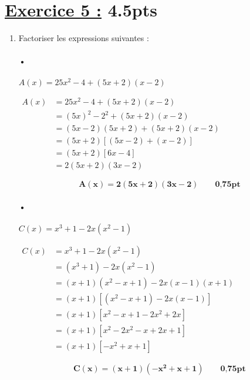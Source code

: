 \documentclass[12pt,a4paper]{article}
\begin{document}
\section*{\underline{Exercice 5 :} 4.5pts}
\begin{enumerate}
    \item Factoriser les expressions suivantes :
 
\paragraph{•}   
\( A(x) = 25x^2 - 4 + (5x + 2)(x - 2) \)

\(
\begin{aligned}
A(x) &= 25x^2 - 4 + (5x + 2)(x - 2) \\
     &= (5x)^2 - 2^2 + (5x + 2)(x - 2) \\
     &= (5x - 2)(5x + 2) + (5x + 2)(x - 2) \\
     &= (5x + 2)\left[(5x - 2) + (x - 2)\right] \\
     &= (5x + 2)\left[6x - 4\right] \\
     &= 2(5x + 2)(3x - 2)
\end{aligned}
\)

\begin{tcolorbox}[colback=yellow!20, colframe=black, sharp corners]
    \[
    \mathbf{A(x) = 2(5x + 2)(3x - 2)}\quad\quad \textbf{0,75pt}
    \]
\end{tcolorbox}

\paragraph{•}
\(
C(x) = x^3 + 1 - 2x(x^2 - 1)
\)

\(
\begin{aligned}
C(x) &= x^3 + 1 - 2x(x^2 - 1) \\
     &= (x^3 + 1) - 2x(x^2 - 1)\\
     &=(x + 1)(x^2 - x + 1) - 2x(x - 1)(x + 1)\\
     &= (x + 1) \left[(x^2 - x + 1) - 2x(x - 1) \right]\\
     &= (x + 1) \left[x^2 - x + 1 - 2x^2 + 2x \right] \\
     &= (x + 1) \left[x^2 - 2x^2 - x + 2x + 1 \right] \\
     &= (x + 1) \left[-x^2 + x + 1 \right]
\end{aligned}
\)



\begin{tcolorbox}[colback=yellow!20, colframe=black, sharp corners]
    \[
    \mathbf{C(x) = (x + 1)(-x^2 + x + 1)}\quad\quad \textbf{0,75pt}
    \]
\end{tcolorbox}


\end{enumerate}
\end{document}

